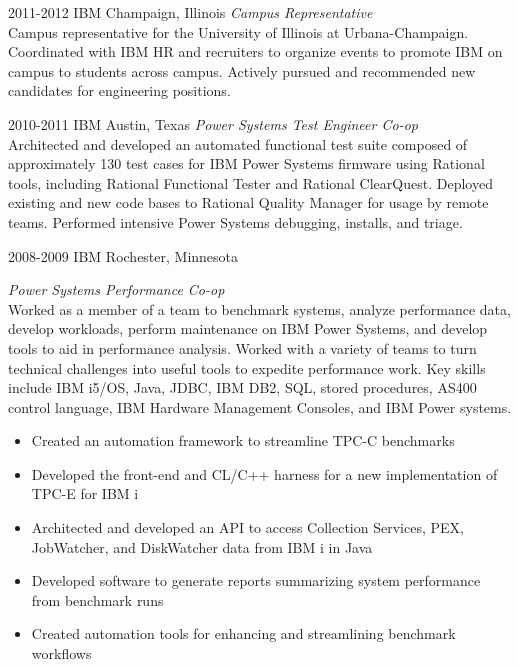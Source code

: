 \documentclass['print']{friggeri-cv} %
\begin{document}
\begin{entrylist}
\entry
{2011-2012}
{IBM}
{Champaign, Illinois}
{\emph{Campus Representative} \\
Campus representative for the University of Illinois at Urbana-Champaign. Coordinated with IBM HR and recruiters to
organize events to promote IBM on campus to students across campus. Actively pursued and recommended new candidates for engineering positions.}
\end{entrylist}
\begin{entrylist}
\entry
{2010-2011}
{IBM}
{Austin, Texas}
{\emph{Power Systems Test Engineer Co-op} \\
Architected and developed an automated functional test suite composed of approximately 130 test cases for IBM Power Systems
firmware using Rational tools, including Rational Functional Tester and Rational ClearQuest. Deployed existing and new code bases to Rational Quality Manager for usage by remote teams. Performed intensive Power Systems debugging, installs, and triage.}
\end{entrylist}
\begin{entrylist}
\entry
{2008-2009}
{IBM}
{Rochester, Minnesota}
{\emph{Power Systems Performance Co-op} \\
Worked as a member of a team to benchmark systems, analyze performance data, develop workloads, perform
maintenance on IBM Power Systems, and develop tools to aid in performance analysis. Worked with a variety of teams to turn technical challenges into useful tools to expedite performance work. Key skills include IBM i5/OS, Java, JDBC, IBM DB2, SQL, stored procedures, AS400 control language, IBM Hardware Management Consoles, and IBM Power systems. 
\begin{itemize}
\item Created an automation framework to streamline TPC-C benchmarks
\item Developed the front-end and CL/C++ harness for a new implementation of TPC-E for IBM i
\item Architected and developed an API to access Collection Services, PEX, JobWatcher, and DiskWatcher data from IBM i in Java
\item Developed software to generate reports summarizing system performance from benchmark runs
\item Created automation tools for enhancing and streamlining benchmark workflows
\end{itemize}}
\end{entrylist}
\end{document}
